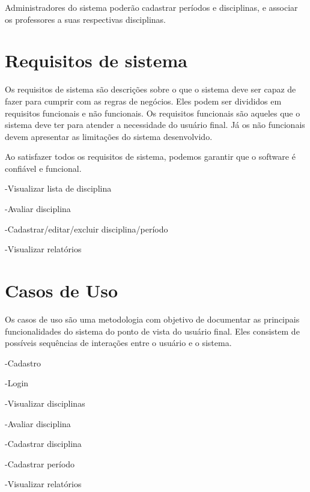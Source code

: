 Administradores do sistema poderão cadastrar períodos e disciplinas, e associar os professores a suas respectivas disciplinas. 

\section{Requisitos de sistema}
Os requisitos de sistema são descrições sobre o que o sistema deve ser capaz de fazer para cumprir com as regras de negócios. Eles podem ser divididos em requisitos funcionais e não funcionais. Os requisitos funcionais são aqueles que o sistema deve ter para atender a necessidade do usuário final. Já os não funcionais devem apresentar as limitações do sistema desenvolvido.

Ao satisfazer todos os requisitos de sistema, podemos garantir que o software é confiável e funcional. 

-Visualizar lista de disciplina

-Avaliar disciplina

-Cadastrar/editar/excluir disciplina/período

-Visualizar relatórios

\section{Casos de Uso}
Os casos de uso são uma metodologia com objetivo de documentar as principais funcionalidades do sistema do ponto de vista do usuário final. Eles consistem de possíveis sequências de interações entre o usuário e o sistema.

-Cadastro

-Login

-Visualizar disciplinas

-Avaliar disciplina

-Cadastrar disciplina

-Cadastrar período

-Visualizar relatórios

%


